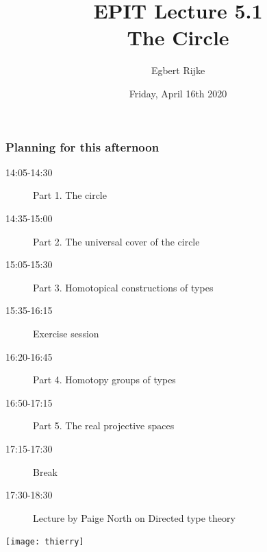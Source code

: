 \documentclass[handout]{beamer}
\title{EPIT Lecture 5.1\\ The Circle}
\author{Egbert Rijke}
\date{Friday, April 16th 2020}
\begin{document}
\begin{frame}
  \maketitle
\end{frame}

\begin{frame}
  \frametitle{Planning for this afternoon}
  \begin{description}
  \item[14:05-14:30] Part 1. The circle
  \item[14:35-15:00] Part 2. The universal cover of the circle
  \item[15:05-15:30] Part 3. Homotopical constructions of types
  \item[15:35-16:15] Exercise session
  \item[16:20-16:45] Part 4. Homotopy groups of types
  \item[16:50-17:15] Part 5. The real projective spaces
  \item[17:15-17:30] Break
  \item[17:30-18:30] Lecture by Paige North on Directed type theory
  \end{description}
\end{frame}

\begin{frame}[plain]
  \begin{center}
    \texttt{[image: thierry]}
  \end{center}
\end{frame}
\end{document}
